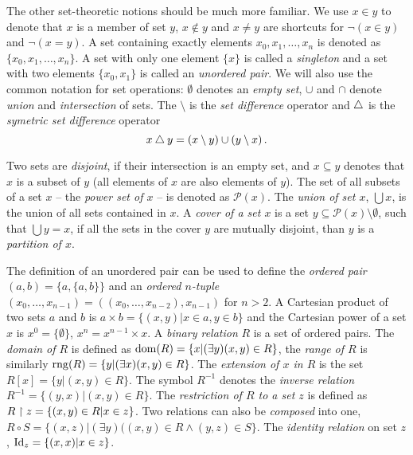 
The other set-theoretic notions should be much more familiar. We use $x \in y$ to denote that $x$ is a member of set $y$, $x \notin y$ and $x \neq y$ are shortcuts for $\neg (x \in y)$ and $\neg (x = y)$. A set containing exactly elements $x_0, x_1, \dots, x_n$ is denoted as $\{x_0, x_1, \dots, x_n\}$. A set with only one element $\{x\}$ is called a \emph{singleton} and a set with two elements $\{x_0, x_1\}$ is called an \emph{unordered pair}. We will also use the common notation for set operations: $\emptyset$ denotes an \emph{empty set}, $\cup$ and $\cap$ denote \emph{union} and \emph{intersection} of sets. The $\setminus$ is the \emph{set difference} operator and $\bigtriangleup$ is the \emph{symetric set difference} operator $$x \bigtriangleup y = (x \setminus y) \cup (y \setminus x)\,.$$

Two sets are \emph{disjoint}, if their intersection is an empty set, and $x \subseteq y$ denotes that $x$ is a subset of $y$ (all elements of $x$ are also elements of $y$). The set of all subsets of a set $x$ -- the \emph{power set of $x$} -- is denoted as $\mathcal{P}(x)$. The \emph{union of set $x$}, $\bigcup x$, is the union of all sets contained in $x$. A \emph{cover of a set $x$} is a set $y \subseteq \mathcal{P}(x) \setminus \emptyset$, such that $\bigcup y = x$, if all the sets in the cover $y$ are mutually disjoint, than $y$ is a \emph{partition of $x$}.

The definition of an unordered pair can be used to define the \emph{ordered pair} $(a, b) = \{a, \{a,b\}\}$ and an \emph{ordered $n$-tuple} $(x_0, \dots, x_{n-1}) = ((x_0, \dots, x_{n-2}), x_{n-1})$ for $n > 2$. A Cartesian product of two sets $a$ and $b$ is $a \times b = \{(x,y) | x \in a, y \in b\}$ and the Cartesian power of a set $x$ is $x^0 = \{\emptyset\}$, $x^n = x^{n-1} \times x$. A \emph{binary relation} $R$ is a set of ordered pairs. The \emph{domain of $R$} is defined as $\operatorname{dom}(R) = \{x|(\exists y)(x,y)\in R\}$, the \emph{range of $R$} is similarly $\operatorname{rng}(R) = \{y|(\exists x)(x,y)\in R\}$. The \emph{extension of $x$ in $R$} is the set $R[x] = \{y|(x,y)\in R\}$. The symbol $R^{-1}$ denotes the \emph{inverse relation} $R^{-1}=\{(y,x)|(x,y)\in R\}$. The \emph{restriction of $R$ to a set $z$} is defined as $R \upharpoonright z = \{(x,y) \in R|x \in z\}$. Two relations can also be \emph{composed} into one, $R \circ S = \{(x,z)|(\exists y)((x,y) \in R \land (y,z) \in S\}$. The \emph{identity relation} on set $z$, $\mathrm{Id}_z = \{(x,x)|x\in z\}$. 


